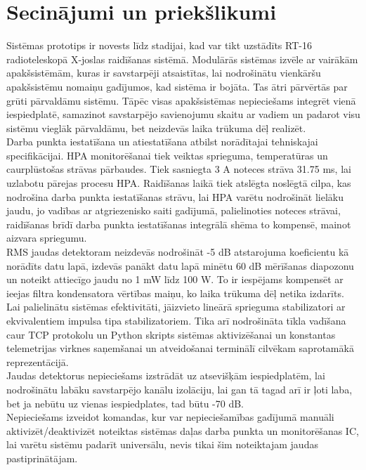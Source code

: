 \chapter{Secinājumi un priekšlikumi}
Sistēmas prototips ir novests līdz stadijai, kad var tikt uzstādīts RT-16 radioteleskopā X-joslas raidīšanas sistēmā. 
Modulārās sistēmas izvēle ar vairākām apakšsistēmām, kuras ir savstarpēji atsaistītas, lai nodrošinātu vienkāršu apakšsistēmu nomaiņu gadījumos, kad sistēma ir bojāta. Tas ātri pārvērtās par grūti pārvaldāmu sistēmu. Tāpēc visas apakšsistēmas nepieciešams integrēt vienā iespiedplatē, samazinot savstarpējo savienojumu skaitu ar vadiem un padarot visu sistēmu vieglāk pārvaldāmu, bet neizdevās laika trūkuma dēļ realizēt.\\
Darba punkta iestatīšana un atiestatīšana atbilst norādītajai tehniskajai specifikācijai. HPA monitorēšanai tiek veiktas sprieguma, temperatūras un caurplūstošas strāvas pārbaudes. Tiek sasniegta 3 A noteces strāva 31.75 ms, lai uzlabotu pārejas procesu HPA. Raidīšanas laikā tiek atslēgta noslēgtā cilpa, kas nodrošina darba punkta iestatīšanas strāvu, lai HPA varētu nodrošināt lielāku jaudu, jo vadības ar atgriezenisko saiti gadījumā, palielinoties noteces strāvai, raidīšanas brīdī darba punkta iestatīšanas integrālā shēma to kompensē, mainot aizvara spriegumu.\\
RMS jaudas detektoram neizdevās nodrošināt -5 dB atstarojuma koeficientu kā norādīts datu lapā, izdevās panākt datu lapā minētu 60 dB mērīšanas diapozonu un noteikt attiecīgo jaudu no 1 mW līdz 100 W. To ir iespējams kompensēt ar ieejas filtra kondensatora vērtības maiņu, ko laika trūkuma dēļ netika izdarīts.\\
Lai palielinātu sistēmas efektivitāti, jāizvieto lineārā sprieguma stabilizatori ar ekvivalentiem impulsa tipa stabilizatoriem.
Tika arī nodrošināta tīkla vadīšana caur TCP protokolu un Python skripts sistēmas aktivizēšanai un konstantas telemetrijas virknes saņemšanai un atveidošanai terminālī cilvēkam saprotamākā reprezentācijā.\\
Jaudas detektorus nepieciešams izstrādāt uz atsevišķām iespiedplatēm, lai nodrošinātu labāku savstarpējo kanālu izolāciju, lai gan tā tagad arī ir ļoti laba, bet ja nebūtu uz vienas iespiedplates, tad būtu -70 dB.\\
Nepieciešams izveidot komandas, kur var nepieciešamības gadījumā manuāli aktivizēt/deaktivizēt noteiktas sistēmas daļas darba punkta un monitorēšanas IC, lai varētu sistēmu padarīt universālu, nevis tikai šim noteiktajam jaudas pastiprinātājam.\\
